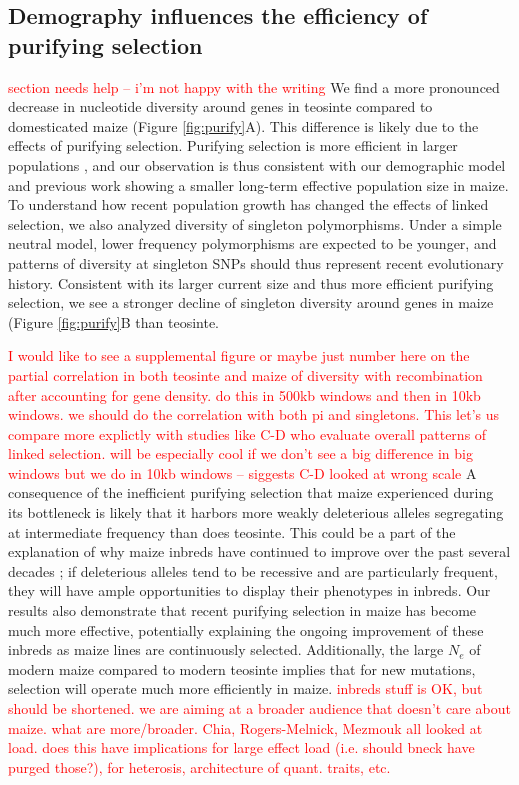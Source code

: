 \documentclass{pnastwo}
\newcommand{\jri}[1]{\textcolor{red}{\scriptsize #1}}
\begin{document}
\begin{article}
\subsection{Demography influences the efficiency of purifying selection}
\jri{section needs help --  i'm not happy with the writing} 
We find a more pronounced decrease in nucleotide diversity around genes in teosinte compared to domesticated maize (Figure \ref{fig:purify}A).
This difference is likely due to the effects of purifying selection.
Purifying selection is more efficient in larger populations  \cite{kimura1984}, and our observation is thus consistent with our demographic model and previous work \cite{eyre1998, tenaillon2004selection, wright2005, ross2009} showing a smaller long-term effective population size in maize.  
To understand how recent population growth has changed the effects of linked selection, we also analyzed diversity of singleton polymorphisms.   Under a simple neutral model, lower frequency polymorphisms are expected to be younger, and patterns of diversity at singleton SNPs should thus represent recent evolutionary history. 
Consistent with its larger current size and thus more efficient purifying selection, we see a stronger decline of singleton diversity around genes in maize (Figure \ref{fig:purify}B than teosinte.

\jri{I would like to see a supplemental figure or maybe just number here on the partial correlation in both teosinte and maize of diversity with recombination after accounting for gene density.  do this in 500kb windows and then in 10kb windows.  we should do the correlation with both pi and singletons.  This let's us compare more explictly with studies like C-D who evaluate overall patterns of linked selection. will be especially cool if we don't see a big difference in big windows but we do in 10kb windows -- siggests C-D looked at wrong scale  }
A consequence of the inefficient purifying selection that maize experienced during its bottleneck is likely that it harbors more weakly deleterious alleles segregating at intermediate frequency than does teosinte. This could be a part of the explanation of why maize inbreds have continued to improve over the past several decades \cite{meghji1984}; if deleterious alleles tend to be recessive and are particularly frequent, they will have ample opportunities to display their phenotypes in inbreds. Our results also demonstrate that recent purifying selection in maize has become much more effective, potentially explaining the ongoing improvement of these inbreds as maize lines are continuously selected. Additionally, the large $N_e$ of modern maize compared to modern teosinte implies that for new mutations, selection will operate much more efficiently in maize. \jri{inbreds stuff is OK, but should be shortened.  we are aiming at a broader audience that doesn't care about maize.  what are more/broader. Chia, Rogers-Melnick, Mezmouk all looked at load. does this have implications for large effect load (i.e. should bneck have purged those?), for heterosis, architecture of quant. traits, etc.}


\end{article}
\end{document}
